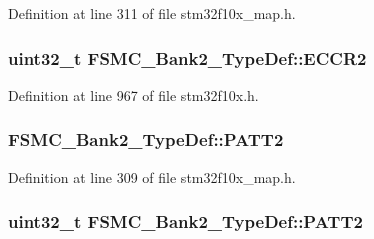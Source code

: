 Definition at line 311 of file stm32f10x\+\_\+map.\+h.

\subsubsection[{\texorpdfstring{E\+C\+C\+R2}{ECCR2}}]{ {\bf uint32\+\_\+t} F\+S\+M\+C\+\_\+\+Bank2\+\_\+\+Type\+Def\+::\+E\+C\+C\+R2}\hypertarget{struct_f_s_m_c___bank2___type_def_afebea17b3ac79d86ad59ce299ab5dd83}{}\label{struct_f_s_m_c___bank2___type_def_afebea17b3ac79d86ad59ce299ab5dd83}


Definition at line 967 of file stm32f10x.\+h.

\subsubsection[{\texorpdfstring{P\+A\+T\+T2}{PATT2}}]{ F\+S\+M\+C\+\_\+\+Bank2\+\_\+\+Type\+Def\+::\+P\+A\+T\+T2}\hypertarget{struct_f_s_m_c___bank2___type_def_a98dded256197c96cab08eaafe0519edb}{}\label{struct_f_s_m_c___bank2___type_def_a98dded256197c96cab08eaafe0519edb}


Definition at line 309 of file stm32f10x\+\_\+map.\+h.

\subsubsection[{\texorpdfstring{P\+A\+T\+T2}{PATT2}}]{ {\bf uint32\+\_\+t} F\+S\+M\+C\+\_\+\+Bank2\+\_\+\+Type\+Def\+::\+P\+A\+T\+T2}\hypertarget{struct_f_s_m_c___bank2___type_def_a9b2c273e4b84f24efbd731bd4ba76a84}{}\label{struct_f_s_m_c___bank2___type_def_a9b2c273e4b84f24efbd731bd4ba76a84}


